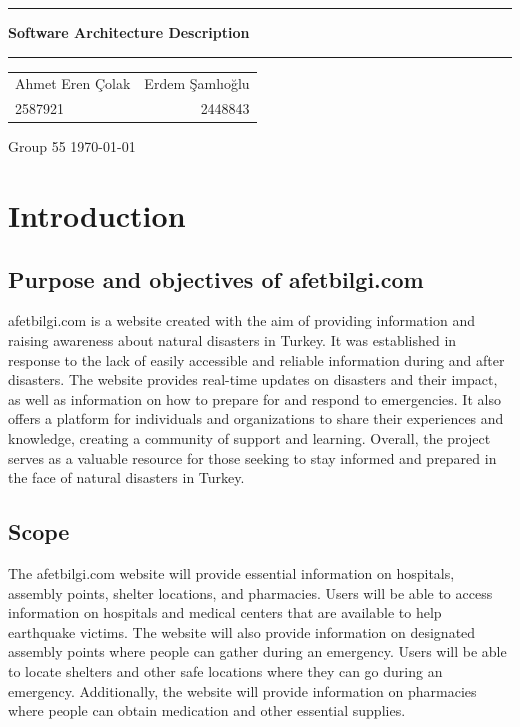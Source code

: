 \documentclass[12pt]{report}
\begin{document}
\begin{titlepage}
    \vspace*{4cm}
    \rule{\textwidth}{2px}
    \vspace{0.2cm}
    
    \textbf{\huge{{Software Architecture Description}}}\par \vspace{0.1cm}
    
    \rule{\textwidth}{2px}
    
    \vspace{1cm}
    
    \begin{tabularx}{\textwidth}{X r}
    \large{Ahmet Eren Çolak }   & \large{Erdem Şamlıoğlu} \\
    2587921 & 2448843
    \end{tabularx}
    
    \vspace{1.3cm}
    
    \vfill
    Group 55 \newline
    \today
    
    
\end{titlepage}

\tableofcontents
\listoffigures
\listoftables

\chapter{Introduction}

\section{Purpose and objectives of afetbilgi.com}
afetbilgi.com is a website created with the aim of providing information and raising awareness 
about natural disasters in Turkey. It was established in response to the lack of easily accessible 
and reliable information during and after disasters. The website provides real-time updates on 
disasters and their impact, as well as information on how to prepare for and respond to emergencies. 
It also offers a platform for individuals and organizations to share their experiences and knowledge, 
creating a community of support and learning. Overall, the project serves as a valuable 
resource for those seeking to stay informed and prepared in the face of natural disasters in Turkey.

\section{Scope}
The afetbilgi.com website will provide essential information on hospitals, assembly points, shelter 
locations, and pharmacies. Users will be able to access information on hospitals and medical centers 
that are available to help earthquake victims. The website will also provide information on designated 
assembly points where people can gather during an emergency. Users will be able to locate shelters 
and other safe locations where they can go during an emergency. Additionally, the website will provide 
information on pharmacies where people can obtain medication and other essential supplies.
\newline
\end{document}
